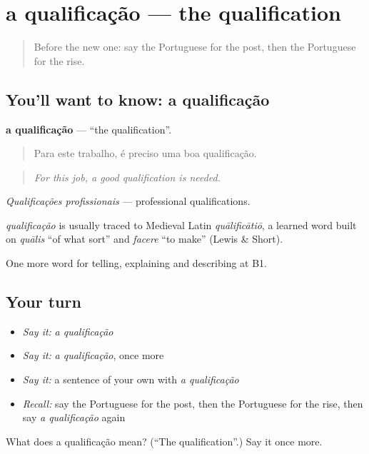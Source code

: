 \section[a qualificação]{a qualificação — the qualification}

\label{lesson:PT-C360-qualificacao}



\begin{quote}
Before the new one: say the Portuguese for the post, then the Portuguese for the rise.
\end{quote}

\subsection*{You'll want to know: a qualificação}
\textbf{a qualificação} — \textquotedblleft{}the qualification\textquotedblright{}.

\begin{quote}
Para este trabalho, é preciso uma boa qualificação.
\end{quote}

\begin{quote}
\emph{For this job, a good qualification is needed.}
\end{quote}

\emph{Qualificações profissionais} — professional qualifications.

\begin{cousinweb}
\emph{qualificação} is usually traced to Medieval Latin \emph{quālificātiō}, a learned word built on \emph{quālis} \textquotedblleft{}of what sort\textquotedblright{} and \emph{facere} \textquotedblleft{}to make\textquotedblright{} (Lewis \& Short).
\end{cousinweb}

\begin{grammarlens}[title={What you've built}]
One more word for telling, explaining and describing at B1.
\end{grammarlens}

\subsection*{Your turn}
\begin{itemize}
\raggedright
  \item \emph{Say it:} \emph{a qualificação}
  \item \emph{Say it:} \emph{a qualificação}, once more
  \item \emph{Say it:} a sentence of your own with \emph{a qualificação}
  \item \emph{Recall:} say the Portuguese for the post, then the Portuguese for the rise, then say \emph{a qualificação} again
\end{itemize}

\begin{tcolorbox}[breakable,colback=teal!4,colframe=teal!35!black,title={Before you move on}]
What does a qualificação mean? (\textquotedblleft{}The qualification\textquotedblright{}.) Say it once more.
\end{tcolorbox}

